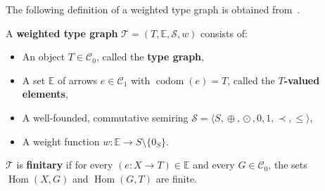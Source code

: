 The following definition of a weighted type graph is obtained from~\cite[\textdef~3.1]{endrullis2024generalized}.
\begin{definition}
    \label{def:weighted_type_graph}
    A \textbf{weighted type graph} \(\mathcal{T} \mathop{=} (T, \mathbb{E}, \mathcal{S}, w)\) consists of:
    \begin{itemize} 
        \item An object \(T \mathop{\in} \mathcal{C}_0\), called the \textbf{type graph},
        \item A set \(\mathbb{E}\) of arrows \(e \mathop{\in} \mathcal{C}_1\) with \(\operatorname{codom}(e) \mathop{=} T\), called the \textbf{\(T\)-valued elements},
        \item A well-founded, commutative semiring \(\mathcal{S}=\langle S, \mathop{\oplus}, \mathop{\odot}, 0, 1, \prec, \leq \rangle \),
        \item A weight function \(w : \mathbb{E} \mathop{\to} S \mathop{\setminus} \{0_S\}\).
    \end{itemize}
    \(\mathcal{T}\) is \textbf{finitary} if for every \((e:X \mathop{\to} T) \mathop{\in} \mathbb{E}\) and every \(G \mathop{\in} \mathcal{C}_0\), the sets \(\operatorname{Hom}(X, G)\) and \(\operatorname{Hom}(G, T)\) are finite.
\end{definition}
